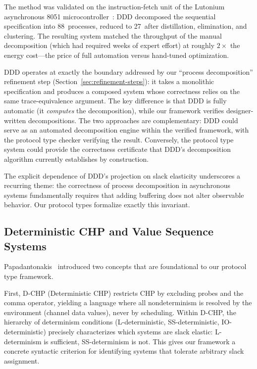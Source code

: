 \documentclass[11pt]{article}
\begin{document}
The method was validated on the instruction-fetch unit of the
Lutonium asynchronous 8051 microcontroller~\cite{martin2003}: DDD
decomposed the sequential specification into 88~processes, reduced to
27~after distillation, elimination, and clustering.  The resulting
system matched the throughput of the manual decomposition (which had
required weeks of expert effort) at roughly $2{\times}$ the energy
cost---the price of full automation versus hand-tuned optimization.

DDD operates at exactly the boundary addressed by our ``process
decomposition'' refinement step (Section~\ref{sec:refinement-steps}):
it takes a monolithic specification and produces a composed system
whose correctness relies on the same trace-equivalence argument.  The
key difference is that DDD is fully automatic (it \emph{computes} the
decomposition), while our framework verifies designer-written
decompositions.  The two approaches are complementary: DDD could serve
as an automated decomposition engine within the verified framework,
with the protocol type checker verifying the result.  Conversely, the
protocol type system could provide the correctness certificate that
DDD's decomposition algorithm currently establishes by construction.

The explicit dependence of DDD's projection on slack elasticity
underscores a recurring theme: the correctness of process
decomposition in asynchronous systems fundamentally requires that
adding buffering does not alter observable behavior.  Our protocol
types formalize exactly this invariant.

\subsection{Deterministic CHP and Value Sequence Systems}
\label{sec:dchp}

Papadantonakis~\cite{papadantonakis2002} introduced two concepts
that are foundational to our protocol type framework.

First, D-CHP (Deterministic CHP) restricts CHP by excluding probes
and the comma operator, yielding a language where all nondeterminism
is resolved by the environment (channel data values), never by
scheduling.  Within D-CHP, the hierarchy of determinism conditions
(L-deterministic, SS-deterministic, IO-deterministic) precisely
characterizes which systems are slack elastic: L-determinism is
sufficient, SS-determinism is not.  This gives our framework a
concrete syntactic criterion for identifying systems that tolerate
arbitrary slack assignment.
\end{document}
